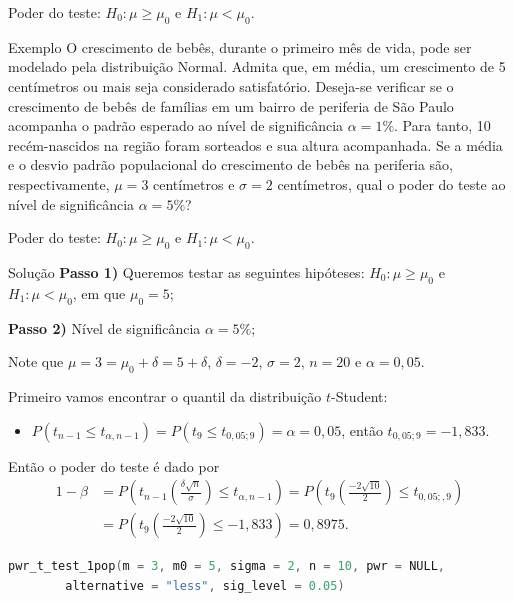 \documentclass[8pt]{beamer}
\begin{document}
\begin{frame}{Poder do teste: $H_0:\mu \geq \mu_0$ e $H_1: \mu < \mu_0$.}

\large
\begin{block}{Exemplo}
	O crescimento de bebês, durante o primeiro mês de vida, pode ser modelado pela distribuição Normal. Admita que, em média, um crescimento de 5 centímetros ou mais seja considerado satisfatório. Deseja-se verificar se o crescimento de bebês de famílias em um bairro de periferia de São Paulo acompanha o padrão esperado ao nível de significância $\alpha=1\%$. Para tanto, 10 recém-nascidos na região foram sorteados e sua altura acompanhada. Se a média e o desvio padrão populacional do crescimento de bebês na periferia são, respectivamente, $\mu=3$ centímetros e $\sigma=2$ centímetros, qual o poder do teste ao nível de significância $\alpha=5\%$?
\end{block}
\normalsize

\end{frame}

\begin{frame}[fragile]{Poder do teste: $H_0:\mu \geq \mu_0$ e $H_1: \mu < \mu_0$.}

\normalsize

\begin{block}{Solução}
	\textbf{Passo 1)} Queremos testar as seguintes hipóteses: $H_0: \mu \geq \mu_0$ e $H_1: \mu < \mu_0$, em que $\mu_0=5$;
	
	\textbf{Passo 2)} Nível de significância $\alpha = 5\%$;
	
	
	Note que $\mu=3=\mu_0 + \delta = 5 + \delta$, $\delta = -2$, $\sigma = 2$, $n=20$ e $\alpha=0,05$.
	
	Primeiro vamos encontrar o quantil da distribuição $t$-Student:
	\begin{itemize}
		\item $P\left( t_{n-1} \leq t_{\alpha, n-1} \right) = P\left( t_9 \leq t_{0,05; 9} \right) = \alpha = 0,05$, então $t_{0,05; 9} = -1,833$.
	\end{itemize}
	
	Então o poder do teste é dado por
	\begin{align*}
		1-\beta &= P \left( t_{n-1}\left( \frac{\delta\sqrt{n}}{\sigma}\right) \leq t_{\alpha, n-1}  \right) = P \left( t_{9}\left( \frac{-2\sqrt{10}}{2}\right) \leq t_{0,05;, 9} \right) \\ 
		&= P \left( t_{9}\left( \frac{-2\sqrt{10}}{2}\right) \leq -1,833 \right) = 0,8975.
	\end{align*}
\end{block}

\begin{lstlisting}[language = C, caption = Código no R.]
pwr_t_test_1pop(m = 3, m0 = 5, sigma = 2, n = 10, pwr = NULL,
		alternative = "less", sig_level = 0.05)
\end{lstlisting}

\normalsize

\end{frame}
\end{document}
